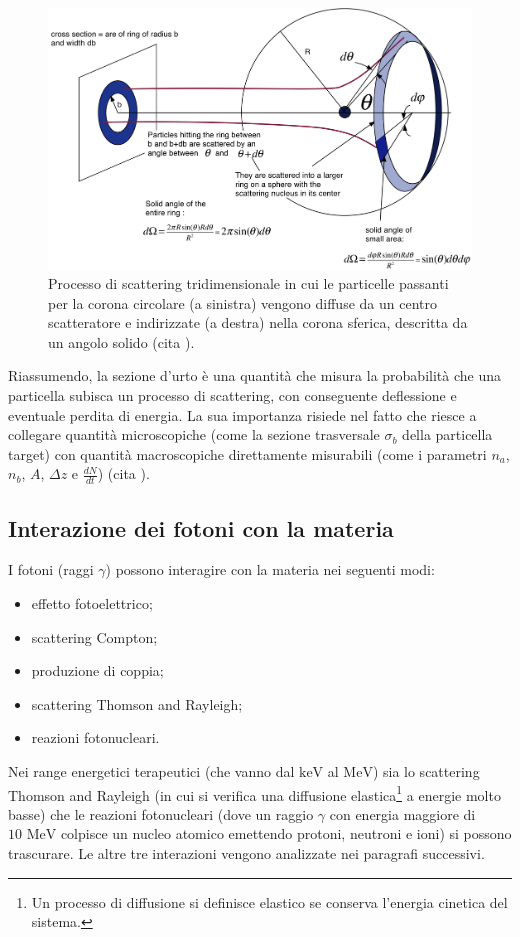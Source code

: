 \documentclass[12pt,a4paper,twoside]{report}
\begin{document}
	\begin{figure}[H]
		\centering
		\includegraphics[width=0.9\linewidth]{solid_angle.png}
		\caption{Processo di scattering tridimensionale in cui le particelle passanti per la corona circolare (a sinistra) vengono diffuse da un centro scatteratore e indirizzate (a destra) nella corona sferica, descritta da un angolo solido (cita
			).}
		\label{fig:solid_angle}
	\end{figure}
	Riassumendo, la sezione d'urto è una quantità che misura la probabilità che una particella subisca un processo di scattering, con conseguente deflessione e eventuale perdita di energia. La sua importanza risiede nel fatto che riesce a collegare quantità microscopiche (come la sezione trasversale $\sigma_b$ della particella target) con quantità macroscopiche direttamente misurabili (come i parametri $n_a$, $n_b$, $A$, $\Delta z$ e $\frac{dN}{dt}$) (cita
	).
	
	\subsection{Interazione dei fotoni con la materia}
	I fotoni (raggi $\gamma$) possono interagire con la materia nei seguenti modi:
	\begin{itemize}
		\item effetto fotoelettrico;
		\item scattering Compton;
		\item produzione di coppia;
		\item scattering Thomson and Rayleigh;
		\item reazioni fotonucleari.
	\end{itemize}
	Nei range energetici terapeutici (che vanno dal $\mbox{keV}$ al $\mbox{MeV}$) sia lo scattering Thomson and Rayleigh (in cui si verifica una diffusione elastica\footnote{Un processo di diffusione si definisce elastico se conserva l'energia cinetica del sistema.} a energie molto basse) che le reazioni fotonucleari (dove un raggio $\gamma$ con energia maggiore di $10\mbox{ MeV}$ colpisce un nucleo atomico emettendo protoni, neutroni e ioni) si possono trascurare. Le altre tre interazioni vengono analizzate nei paragrafi successivi.
	
\end{document}
